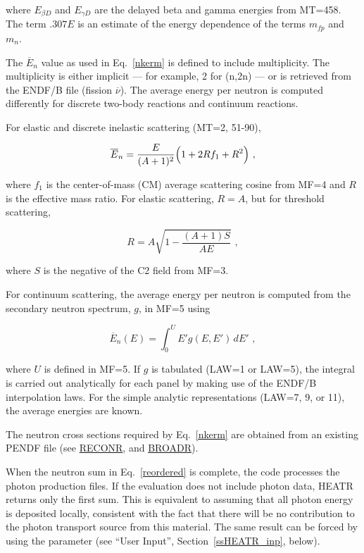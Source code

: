 \noindent
where $E_{\beta D}$ and $E_{\gamma D}$ are the delayed beta
and gamma energies from MT=458.  The term $.307E$ is an estimate
of the energy dependence of the terms $m_{fp}$ and $m_n$.

The $\overline{E}_n$ value as used in Eq.~\ref{nkerm} is
defined to include multiplicity.  The multiplicity is either
implicit --- for example, 2 for (n,2n) --- or is retrieved from the
ENDF/B file (fission $\overline{\nu}$).  The average energy per
neutron is computed differently for discrete two-body reactions
and continuum reactions.

For elastic and discrete inelastic scattering (MT=2, 51-90),

\begin{equation}
   \overline{E}_n=\frac{E}{(A+1)^2}\Bigl(1+2Rf_1+R^2\Bigr)\,\,,
\label{enb}
\end{equation}

\noindent
where $f_1$ is the center-of-mass (CM) average scattering cosine
from MF=4 and $R$ is the effective mass ratio.  For elastic
scattering, $R{=}A$, but for threshold scattering,

\begin{equation}
   R=A\sqrt{1-\frac{(A+1)S}{AE}}\,\,,
\end{equation}

\noindent
where $S$ is the negative of the C2 field from MF=3.

For continuum scattering, the average energy per neutron is
computed from the secondary neutron spectrum, $g$, in MF=5 using

\begin{equation}
   \overline{E}_n(E)=\int_0^U E'g(E,E')\,dE'\,\,,
\end{equation}

\noindent
where $U$ is defined in MF=5.  If $g$ is tabulated (LAW=1 or
LAW=5), the integral is carried out analytically for each panel
by making use of the ENDF/B interpolation laws.  For the simple
analytic representations (LAW=7, 9, or 11), the average energies
are known\cite{ENDF102}.

The neutron cross sections required by Eq.~\ref{nkerm} are
obtained from an existing PENDF file (see
\hyperlink{sRECONRhy}{RECONR},
and \hyperlink{sBROADRhy}{BROADR}).

When the neutron sum in Eq.~\ref{reordered} is complete, the
code processes the photon production files.  If the evaluation
does not include photon data, HEATR returns only the first sum.
This is equivalent to assuming that all photon energy is
deposited locally, consistent with the fact that there will
be no contribution to the photon transport source from this
material.  The same result can be forced by using the
 parameter (see ``User Input'', Section~\ref{ssHEATR_inp}, below).

